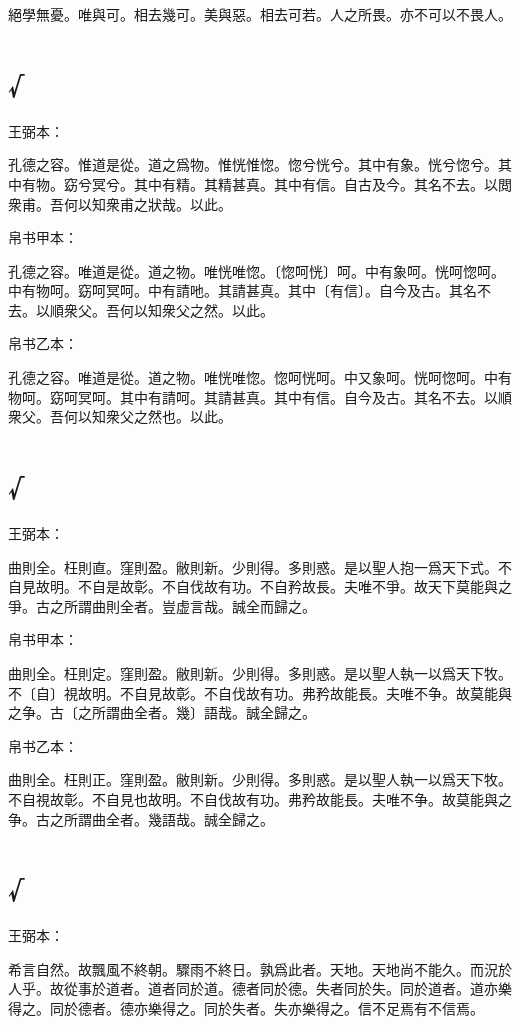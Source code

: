 \documentclass[a5paper]{ctexbook}
\begin{document}
    絕學無憂。唯與可。相去幾可。美與惡。相去可若。人之所畏。亦不可以不畏人。

    \chapter{√}
    王弼本：

    孔德之容。惟道是從。道之爲物。惟恍惟惚。惚兮恍兮。其中有象。恍兮惚兮。其中有物。窈兮冥兮。其中有精。其精甚真。其中有信。自古及今。其名不去。以閲衆甫。吾何以知衆甫之狀哉。以此。

    
    帛书甲本：

    孔德之容。唯道是從。道之物。唯恍唯惚。〔惚呵恍〕呵。中有象呵。恍呵惚呵。中有物呵。窈呵冥呵。中有請吔。其請甚真。其中〔有信〕。自今及古。其名不去。以順衆父。吾何以知衆父之然。以此。

    帛书乙本：

    孔德之容。唯道是從。道之物。唯恍唯惚。惚呵恍呵。中又象呵。恍呵惚呵。中有物呵。窈呵冥呵。其中有請呵。其請甚真。其中有信。自今及古。其名不去。以順衆父。吾何以知衆父之然也。以此。

    \chapter{√}
    王弼本：

    曲則全。枉則直。窪則盈。敝則新。少則得。多則惑。是以聖人抱一爲天下式。不自見故明。不自是故彰。不自伐故有功。不自矜故長。夫唯不爭。故天下莫能與之爭。古之所謂曲則全者。豈虚言哉。誠全而歸之。

    
    帛书甲本：

    曲則全。枉則定。窪則盈。敝則新。少則得。多則惑。是以聖人執一以爲天下牧。不〔自〕視故明。不自見故彰。不自伐故有功。弗矜故能長。夫唯不争。故莫能與之争。古〔之所謂曲全者。幾〕語哉。誠全歸之。

    帛书乙本：

    曲則全。枉則正。窪則盈。敝則新。少則得。多則惑。是以聖人執一以爲天下牧。不自視故彰。不自見也故明。不自伐故有功。弗矜故能長。夫唯不争。故莫能與之争。古之所謂曲全者。幾語哉。誠全歸之。

    \chapter{√}
    王弼本：

    希言自然。故飄風不終朝。驟雨不終日。孰爲此者。天地。天地尚不能久。而況於人乎。故從事於道者。道者同於道。德者同於德。失者同於失。同於道者。道亦樂得之。同於德者。德亦樂得之。同於失者。失亦樂得之。信不足焉有不信焉。
\end{document}
